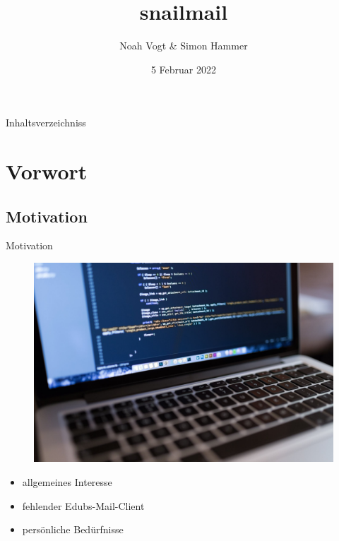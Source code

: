 \documentclass[aspectratio=169]{beamer}
\title{snailmail}
\author{Noah Vogt \& Simon Hammer}
\date{5 Februar 2022}
\institute{Gymnasium Kirschgarten}
\newlength\myheight
\newlength\mydepth
\newcommand*\inlinegraphics[1]{
    \settototalheight\myheight{Xygp}
    \settodepth\mydepth{Xygp}
    \raisebox{-\mydepth}{\texttt{[image: \#1]}}%
}
\begin{document}
\maketitle

\begin{frame}[plain]{Inhaltsverzeichniss}
    \tableofcontents
\end{frame}

\section{Vorwort}
\subsection{Motivation}
\begin{frame}[plain]{Motivation}
\begin{varwidth}{.5\textwidth}
        \begin{figure}
            \centering
            \includegraphics[width=.9\textwidth]{media/macbook.jpg}
        \end{figure}
    \end{varwidth}
    \hfill
    \begin{varwidth}{.5\textwidth}
        \begin{itemize}\pause
            \item allgemeines Interesse\pause
            \item fehlender Edubs-Mail-Client\pause
            \item persönliche Bedürfnisse
        \end{itemize}
    \end{varwidth} 
\end{frame}
\end{document}
